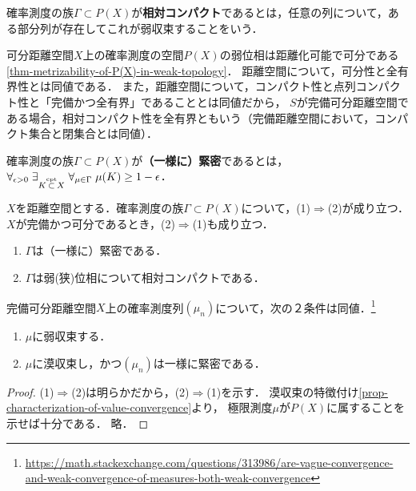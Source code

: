 \documentclass[uplatex,dvipdfmx]{jsreport}
\begin{document}
\begin{definition}
    確率測度の族$\Gamma\subset P(X)$が\textbf{相対コンパクト}であるとは，任意の列について，ある部分列が存在してこれが弱収束することをいう．
\end{definition}
\begin{remarks}
    可分距離空間$X$上の確率測度の空間$P(X)$の弱位相は距離化可能で可分である\ref{thm-metrizability-of-P(X)-in-weak-topology}．
    距離空間について，可分性と全有界性とは同値である．
    また，距離空間について，コンパクト性と点列コンパクト性と「完備かつ全有界」であることとは同値だから，
    $S$が完備可分距離空間である場合，相対コンパクト性を全有界ともいう（完備距離空間において，コンパクト集合と閉集合とは同値）．
\end{remarks}

\begin{definition}
    確率測度の族$\Gamma\subset P(X)$が\textbf{（一様に）緊密}であるとは，
    $\forall_{\epsilon>0}\;\exists_{K\overset{\text{cpt}}{\subset} X}\;\forall_{\mu\in\Gamma}\;\mu(K)\ge 1-\epsilon$．
\end{definition}

\begin{theorem}
    $X$を距離空間とする．確率測度の族$\Gamma\subset P(X)$について，(1)$\Rightarrow$(2)が成り立つ．
    $X$が完備かつ可分であるとき，(2)$\Rightarrow$(1)も成り立つ．
    \begin{enumerate}
        \item  $\Gamma$は（一様に）緊密である．
        \item $\Gamma$は弱(狭)位相について相対コンパクトである．
    \end{enumerate}
\end{theorem}

\begin{corollary}[漠収束の特徴付け]
    完備可分距離空間$X$上の確率測度列$(\mu_n)$について，次の２条件は同値．\footnote{\url{https://math.stackexchange.com/questions/313986/are-vague-convergence-and-weak-convergence-of-measures-both-weak-convergence}}
    \begin{enumerate}
        \item $\mu$に弱収束する．
        \item $\mu$に漠収束し，かつ$(\mu_n)$は一様に緊密である．
    \end{enumerate}
\end{corollary}
\begin{proof}
    (1)$\Rightarrow$(2)は明らかだから，(2)$\Rightarrow$(1)を示す．
    漠収束の特徴付け\ref{prop-characterization-of-value-convergence}より，
    極限測度$\mu$が$P(X)$に属することを示せば十分である．
    略．
\end{proof}
\end{document}
